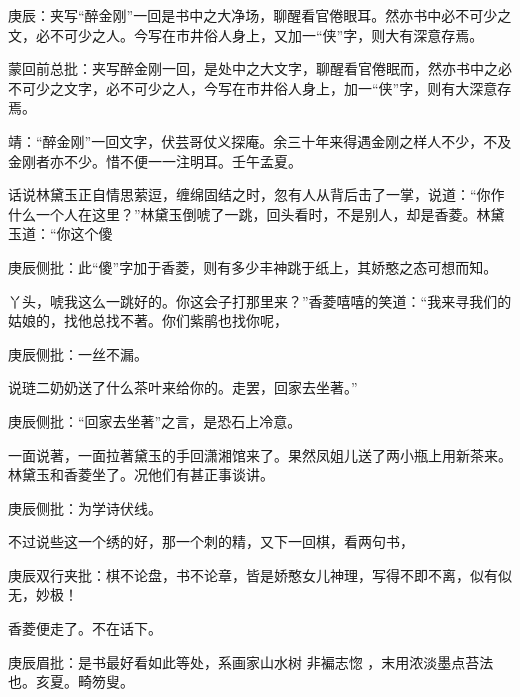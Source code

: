 \begin{parag}

    \begin{note}庚辰：夹写“醉金刚”一回是书中之大净场，聊醒看官倦眼耳。然亦书中必不可少之文，必不可少之人。今写在市井俗人身上，又加一“侠”字，则大有深意存焉。\end{note}
\end{parag}


\begin{parag}


    \begin{note}蒙回前总批：夹写醉金刚一回，是处中之大文字，聊醒看官倦眠而，然亦书中之必不可少之文字，必不可少之人，今写在市井俗人身上，加一“侠”字，则有大深意存焉。\end{note}
\end{parag}


\begin{parag}


    \begin{note}靖：“醉金刚”一回文字，伏芸哥仗义探庵。余三十年来得遇金刚之样人不少，不及金刚者亦不少。惜不便一一注明耳。壬午孟夏。\end{note}
\end{parag}

\begin{parag}

    话说林黛玉正自情思萦逗，缠绵固结之时，忽有人从背后击了一掌，说道：“你作什么一个人在这里？”林黛玉倒唬了一跳，回头看时，不是别人，却是香菱。林黛玉道：“你这个傻\begin{note}庚辰侧批：此“傻”字加于香菱，则有多少丰神跳于纸上，其娇憨之态可想而知。\end{note}丫头，唬我这么一跳好的。你这会子打那里来？”香菱嘻嘻的笑道：“我来寻我们的姑娘的，找他总找不著。你们紫鹃也找你呢，\begin{note}庚辰侧批：一丝不漏。\end{note}说琏二奶奶送了什么茶叶来给你的。走罢，回家去坐著。”\begin{note}庚辰侧批：“回家去坐著”之言，是恐石上冷意。\end{note}一面说著，一面拉著黛玉的手回潇湘馆来了。果然凤姐儿送了两小瓶上用新茶来。林黛玉和香菱坐了。况他们有甚正事谈讲。\begin{note}庚辰侧批：为学诗伏线。\end{note}不过说些这一个绣的好，那一个刺的精，又下一回棋，看两句书，\begin{note}庚辰双行夹批：棋不论盘，书不论章，皆是娇憨女儿神理，写得不即不离，似有似无，妙极！\end{note}香菱便走了。不在话下。\begin{note}庚辰眉批：是书最好看如此等处，系画家山水树 非褊志惚 ，末用浓淡墨点苔法也。亥夏。畸笏叟。\end{note}
\end{parag}


